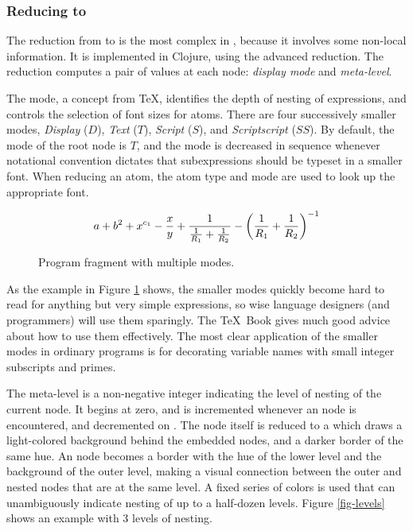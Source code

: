 \subsubsection{Reducing  to }
The reduction from  to  is the most complex in \Meta, because it involves some non-local information. It is implemented in Clojure, using the advanced reduction. The reduction computes a pair of values at each node: \emph{display mode} and \emph{meta-level}.

The mode, a concept from \TeX, identifies the depth of nesting of expressions, and controls the selection of font sizes for atoms. There are four successively smaller modes, \textit{Display} ($D$), \textit{Text} ($T$), \textit{Script} ($S$), and \textit{Scriptscript} ($SS$). By default, the mode of the root node is $T$, and the mode is decreased in sequence whenever notational convention dictates that subexpressions should be typeset in a smaller font. When reducing an atom, the atom type and mode are used to look up the appropriate font. 

\begin{figure}[ht]
$$
a + b^2 + x^{c_1}
 - { x \over y }
 + { 1 \over { 1 \over R_1 }
 + { 1 \over R_2} }
 - \left({ 1 \over R_1 } + { 1 \over R_2}\right)^{-1}
$$
\caption{\label{fig-modes} Program fragment with multiple modes.}
\end{figure}

As the example in Figure \ref{fig-modes} shows, the smaller modes quickly become hard to read for anything but very simple expressions, so wise language designers (and programmers) will use them sparingly. The \TeX\ Book\cite{knuth} gives much good advice about how to use them effectively. The most clear application of the smaller modes in ordinary programs is for decorating variable names with small integer subscripts and primes.

The meta-level is a non-negative integer indicating the level of nesting of the current node. It begins at zero, and is incremented whenever an  node is encountered, and decremented on . The  node itself is reduced to a  which draws a light-colored background behind the embedded nodes, and a darker border of the same hue. An  node becomes a border with the hue of the lower level and the background of the outer level, making a visual connection between the outer and nested nodes that are at the same level. A fixed series of colors is used that can unambiguously indicate nesting of up to a half-dozen levels. Figure \ref{fig-levels} shows an example with 3 levels of nesting.

